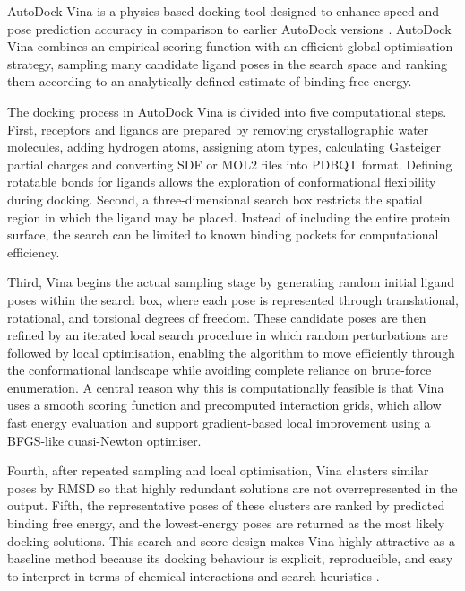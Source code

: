 AutoDock Vina is a physics-based docking tool designed to enhance speed and pose prediction accuracy in comparison to earlier AutoDock versions \cite{ref022}. AutoDock Vina combines an empirical scoring function with an efficient global optimisation strategy, sampling many candidate ligand poses in the search space and ranking them according to an analytically defined estimate of binding free energy.

The docking process in AutoDock Vina is divided into five computational steps. First, receptors and ligands are prepared by removing crystallographic water molecules, adding hydrogen atoms, assigning atom types, calculating Gasteiger partial charges and converting SDF or MOL2 files into PDBQT format. Defining rotatable bonds for ligands allows the exploration of conformational flexibility during docking. Second, a three-dimensional search box restricts the spatial region in which the ligand may be placed. Instead of including the entire protein surface, the search can be limited to known binding pockets for computational efficiency.

Third, Vina begins the actual sampling stage by generating random initial ligand poses within the search box, where each pose is represented through translational, rotational, and torsional degrees of freedom. These candidate poses are then refined by an iterated local search procedure in which random perturbations are followed by local optimisation, enabling the algorithm to move efficiently through the conformational landscape while avoiding complete reliance on brute-force enumeration. A central reason why this is computationally feasible is that Vina uses a smooth scoring function and precomputed interaction grids, which allow fast energy evaluation and support gradient-based local improvement using a BFGS-like quasi-Newton optimiser.

Fourth, after repeated sampling and local optimisation, Vina clusters similar poses by RMSD so that highly redundant solutions are not overrepresented in the output. Fifth, the representative poses of these clusters are ranked by predicted binding free energy, and the lowest-energy poses are returned as the most likely docking solutions. This search-and-score design makes Vina highly attractive as a baseline method because its docking behaviour is explicit, reproducible, and easy to interpret in terms of chemical interactions and search heuristics \cite{ref023}.


